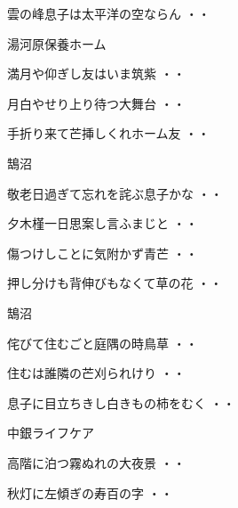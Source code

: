 \begin{shiika}雲の峰息子は太平洋の空ならん
\hfill{・・}\end{shiika}
\vspace{0.6cm}
湯河原保養ホーム
\begin{shiika}満月や仰ぎし友はいま筑紫
\hfill{・・}\end{shiika}
\begin{shiika}月白やせり上り待つ大舞台
\hfill{・・}\end{shiika}
\begin{shiika}手折り来て芒挿しくれホーム友
\hfill{・・}\end{shiika}
\vspace{0.6cm}
鵠沼
\begin{shiika}敬老日過ぎて忘れを詫ぶ息子かな
\hfill{・・}\end{shiika}
\begin{shiika}夕木槿一日思案し言ふまじと
\hfill{・・}\end{shiika}
\begin{shiika}傷つけしことに気附かず青芒
\hfill{・・}\end{shiika}
\begin{shiika}押し分けも背伸びもなくて草の花
\hfill{・・}\end{shiika}
\vspace{0.6cm}
鵠沼
\begin{shiika}侘びて住むごと庭隅の時鳥草
\hfill{・・}\end{shiika}
\begin{shiika}住むは誰隣の芒刈られけり
\hfill{・・}\end{shiika}
\begin{shiika}息子に目立ちきし白きもの柿をむく
\hfill{・・}\end{shiika}
\vspace{0.6cm}
中銀ライフケア
\begin{shiika}高階に泊つ霧ぬれの大夜景
\hfill{・・}\end{shiika}
\begin{shiika}秋灯に左傾ぎの寿百の字
\hfill{・・}\end{shiika}
